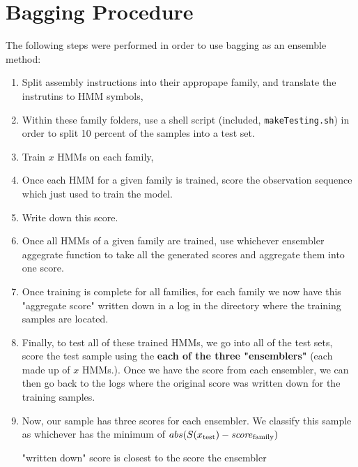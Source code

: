 \documentclass[12pt]{article}
\begin{document}
\section{Bagging Procedure}
  The following steps were performed in order to use bagging as an ensemble method:
  \begin{enumerate}
    \item Split assembly instructions into their appropape family, and translate the instrutins to HMM symbols,
    \item Within these family folders, use a shell script (included, \texttt{makeTesting.sh}) in order to split 10 percent of the samples into a test set.
    \item Train $x$ HMMs on each family,
    \item Once each HMM for a given family is trained, score the observation sequence which just used to train the model.
    \item Write down this score. 
    \item Once all HMMs of a given family are trained, use whichever ensembler aggegrate function to take all the generated scores and aggregate them into one score. 
    \item Once training is complete for all families, for each family we now have this "aggregate score" written down in a log in the directory where the training samples are located.
    \item Finally, to test all of these trained HMMs, we go into all of the test sets, score the test sample using the \textbf{each of the three "ensemblers"} (each made up of $x$ HMMs.). Once we have the score from each ensembler, we can then go back to the logs where the original score was written down for the training samples. 
  \item Now, our sample has three scores for each ensembler. We classify this sample as whichever has the minimum of $abs(S(x_{\text{test}}) - \text{\textit{score}}_\text{family} )$

      "written down" score is closest to the score the ensembler
  \end{enumerate}
\end{document}

